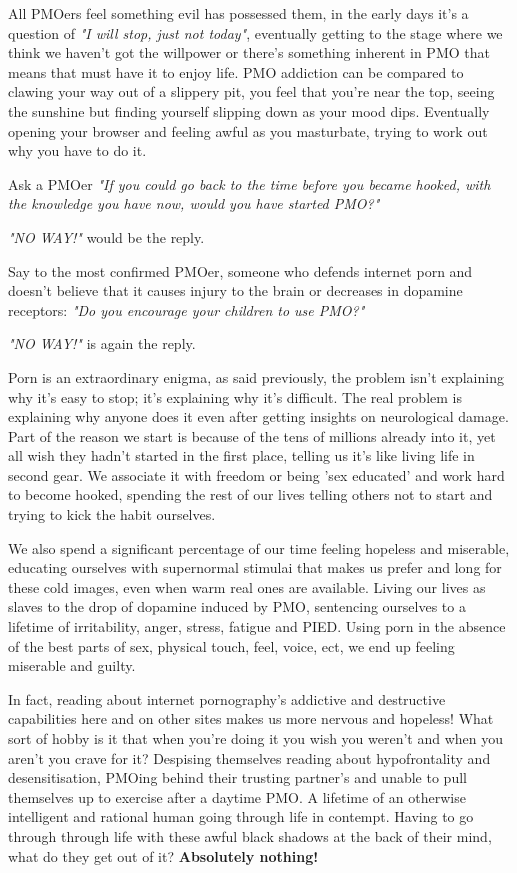 \documentclass[easypeasy.tex]{subfiles}
\begin{document}
All PMOers feel something evil has possessed them, in the early days it's a question of \textit{"I will stop, just not today"}, eventually getting to the stage where we think we haven't got the willpower or there's something inherent in PMO that means that must have it to enjoy life. PMO addiction can be compared to clawing your way out of a slippery pit, you feel that you're near the top, seeing the sunshine but finding yourself slipping down as your mood dips. Eventually opening your browser and feeling awful as you masturbate, trying to work out why you have to do it.

Ask a PMOer \textit{"If you could go back to the time before you became hooked, with the knowledge you have now, would you have started PMO?"}

\textit{"NO WAY!"} would be the reply.

Say to the most confirmed PMOer, someone who defends internet porn and doesn't believe that it causes injury to the brain or decreases in dopamine receptors: \textit{"Do you encourage your children to use PMO?"}

\textit{"NO WAY!"} is again the reply.

Porn is an extraordinary enigma, as said previously, the problem isn't explaining why it's easy to stop; it's explaining why it's difficult. The real problem is explaining why anyone does it even after getting insights on neurological damage. Part of the reason we start is because of the tens of millions already into it, yet all wish they hadn't started in the first place, telling us it's like living life in second gear. We associate it with freedom or being 'sex educated' and work hard to become hooked, spending the rest of our lives telling others not to start and trying to kick the habit ourselves.

We also spend a significant percentage of our time feeling hopeless and miserable, educating ourselves with supernormal stimulai that makes us prefer and long for these cold images, even when warm real ones are available. Living our lives as slaves to the drop of dopamine induced by PMO, sentencing ourselves to a lifetime of irritability, anger, stress, fatigue and PIED. Using porn in the absence of the best parts of sex, physical touch, feel, voice, ect, we end up feeling miserable and guilty.

In fact, reading about internet pornography's addictive and destructive capabilities here and on other sites makes us more nervous and hopeless! What sort of hobby is it that when you're doing it you wish you weren't and when you aren't you crave for it? Despising themselves reading about hypofrontality and desensitisation, PMOing behind their trusting partner's and unable to pull themselves up to exercise after a daytime PMO. A lifetime of an otherwise intelligent and rational human going through life in contempt. Having to go through through life with these awful black shadows at the back of their mind, what do they get out of it? \textbf{Absolutely nothing!}
\end{document}
